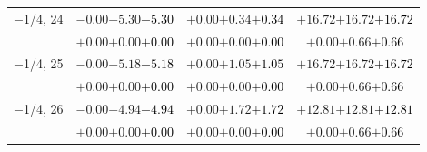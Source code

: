 \documentclass[compress]{beamer}
\begin{document}
\begin{frame}
\begin{tabular}{r | c | c | c}
$-$1/4, 24 & $-0.00$\hspace{0.1 cm}$-5.30$\hspace{0.1 cm}\textcolor{black}{$-5.30$} & $+0.00$\hspace{0.1 cm}$+0.34$\hspace{0.1 cm}\textcolor{black}{$+0.34$} & $+16.72$\hspace{0.1 cm}$+16.72$\hspace{0.1 cm}\textcolor{black}{$+16.72$} \\
           & $+0.00$\hspace{0.1 cm}$+0.00$\hspace{0.1 cm}\textcolor{black}{$+0.00$} & $+0.00$\hspace{0.1 cm}$+0.00$\hspace{0.1 cm}\textcolor{black}{$+0.00$} & $+0.00$\hspace{0.1 cm}$+0.66$\hspace{0.1 cm}\textcolor{black}{$+0.66$} \\
$-$1/4, 25 & $-0.00$\hspace{0.1 cm}$-5.18$\hspace{0.1 cm}\textcolor{black}{$-5.18$} & $+0.00$\hspace{0.1 cm}$+1.05$\hspace{0.1 cm}\textcolor{black}{$+1.05$} & $+16.72$\hspace{0.1 cm}$+16.72$\hspace{0.1 cm}\textcolor{black}{$+16.72$} \\
           & $+0.00$\hspace{0.1 cm}$+0.00$\hspace{0.1 cm}\textcolor{black}{$+0.00$} & $+0.00$\hspace{0.1 cm}$+0.00$\hspace{0.1 cm}\textcolor{black}{$+0.00$} & $+0.00$\hspace{0.1 cm}$+0.66$\hspace{0.1 cm}\textcolor{black}{$+0.66$} \\
$-$1/4, 26 & $-0.00$\hspace{0.1 cm}$-4.94$\hspace{0.1 cm}\textcolor{black}{$-4.94$} & $+0.00$\hspace{0.1 cm}$+1.72$\hspace{0.1 cm}\textcolor{black}{$+1.72$} & $+12.81$\hspace{0.1 cm}$+12.81$\hspace{0.1 cm}\textcolor{black}{$+12.81$} \\
           & $+0.00$\hspace{0.1 cm}$+0.00$\hspace{0.1 cm}\textcolor{black}{$+0.00$} & $+0.00$\hspace{0.1 cm}$+0.00$\hspace{0.1 cm}\textcolor{black}{$+0.00$} & $+0.00$\hspace{0.1 cm}$+0.66$\hspace{0.1 cm}\textcolor{black}{$+0.66$} \\

\end{tabular}
\end{frame}
\end{document}
